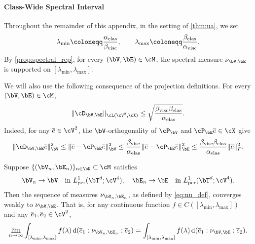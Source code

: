 \paragraph{Class-Wide Spectral Interval}
Throughout the remainder of this appendix, in the setting of \cref{thm:ua}, we set
\begin{equation}\label{eq:lambda_min_max_class}
\lambda_{\min}\coloneqq \frac{\alpha_{\rm elas}}{\beta_{\rm visc}},
\qquad
\lambda_{\max}\coloneqq \frac{\beta_{\rm elas}}{\alpha_{\rm visc}}.
\end{equation}
By \cref{prop:spectral_rep}, for every $(\bV,\bE)\in\cM$, the spectral measure $\nu_{\bV,\bE}$ is supported on $[\lambda_{\min},\lambda_{\max}]$.

We will also use the following consequence of the projection definitions. For every $(\bV,\bE)\in\cM$,
\begin{equation}\label{eq:D_uniform_bound_explicit}
\|\cD_{\bV,\bE}\|_{\cL(\cV^{2},\cX)}
\le
\sqrt{\frac{\beta_{\rm visc}\beta_{\rm elas}}{\alpha_{\rm elas}}}.
\end{equation}
Indeed, for any $\overline e\in\cV^2$, the $\bV$-orthogonality of $\cP_{\bV}$ and $\cP_{\bE}\overline e\in\cX$ give
\begin{equation*}
\|\cD_{\bV,\bE}\overline e\|_{\bV}^2
\le \|\overline e-\cP_{\bE}\overline e\|_{\bV}^2
\le \frac{\beta_{\rm visc}}{\alpha_{\rm elas}}\|\overline e-\cP_{\bE}\overline e\|_{\bE}^2
\le \frac{\beta_{\rm visc}\beta_{\rm elas}}{\alpha_{\rm elas}}\|\overline e\|_F^2.
\end{equation*}

\begin{lemma}
\label{lem:weak_convergence}
Suppose $\{(\bV_n,\bE_n)\}_{n\in\bN}\subset\cM$ satisfies
\begin{equation*}
    \bV_n\to\bV\quad \text{in } L^1_{\mathrm{per}}(\bT^d;\cV^{4}),\quad
    \bE_n\to\bE\quad \text{in } L^1_{\mathrm{per}}(\bT^d;\cV^{4}).
\end{equation*}
Then the sequence of measures $\nu_{\bV_n,\bE_n}$, as defined by \cref{eq:nu_def}, converges weakly to $\nu_{\bV,\bE}$. That is, for any continuous function $f \in C([\lambda_{\min}, \lambda_{\max}])$ and any $\overline{e}_1, \overline{e}_2 \in \cV^{2}$,
\begin{equation*}
    \lim_{n \to \infty} \int_{[\lambda_{\min}, \lambda_{\max}]} f(\lambda) \, \mathrm{d}(\overline{e}_1:\nu_{\bV_n,\bE_n}:\overline{e}_2) = \int_{[\lambda_{\min}, \lambda_{\max}]} f(\lambda) \, \mathrm{d}(\overline{e}_1:\nu_{\bV,\bE}:\overline{e}_2).
\end{equation*}
\end{lemma}

